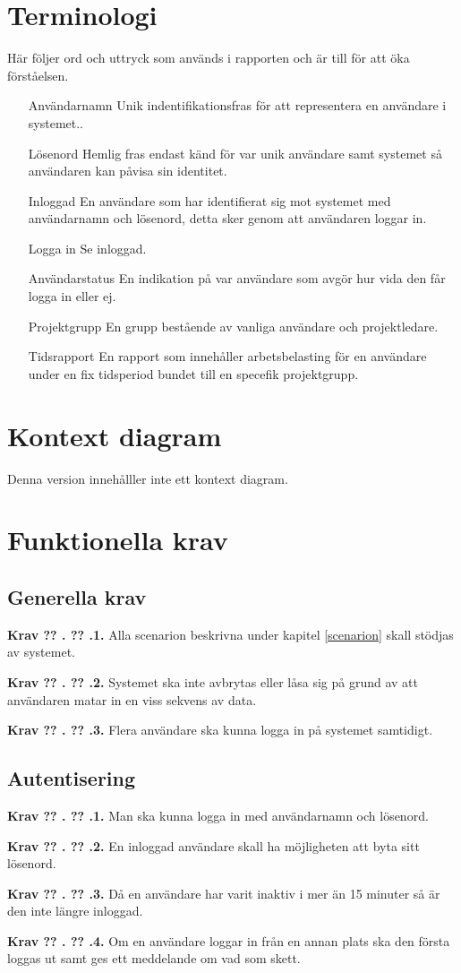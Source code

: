 \documentclass[a4paper]{article}
\newcommand\getcurrentref[1]{%
 \ifnumequal{\value{#1}}{0}
  {??}
  {\the\value{#1}}%
}
\newcommand\requirement[2]{
	\numberedrow{Krav}{#1}{#2}
}
\newcommand\numberedrow[3]{
	\noindent
	\textbf{#1 \getcurrentref{section}.\getcurrentref{subsection}.#2.} #3
	
}
\begin{document}
\section{Terminologi}
Här följer ord och uttryck som används i rapporten och är till för att öka förståelsen.
\begin{itemize}
\item [Användarnamn] Unik indentifikationsfras för att representera en användare i systemet..
\item [Lösenord] Hemlig fras endast känd för var unik användare samt systemet så användaren kan påvisa sin identitet.
\item [Inloggad] En användare som har identifierat sig mot systemet med användarnamn och lösenord, detta sker genom att användaren loggar in.
\item [Logga in] Se inloggad.
\item [Användarstatus] En indikation på var användare som avgör hur vida den får logga in eller ej.
\item [Projektgrupp] En grupp bestående av vanliga användare och projektledare.
\item [Tidsrapport] En rapport som innehåller arbetsbelasting för en användare under en fix tidsperiod bundet till en specefik projektgrupp.
\end{itemize}
\section{Kontext diagram}
Denna version innehålller inte ett kontext diagram.
\section{Funktionella krav}
\subsection{Generella krav}
 \requirement{1}{Alla scenarion beskrivna under kapitel \ref{scenarion} skall stödjas av systemet.}
 \requirement{2}{Systemet ska inte avbrytas eller låsa sig på grund av att användaren matar in en viss sekvens av data.}
 \requirement{3}{Flera användare ska kunna logga in på systemet samtidigt.}
 
\subsection{Autentisering}
\requirement{1}{Man ska kunna logga in med användarnamn och lösenord.}
\requirement{2}{En inloggad användare skall ha möjligheten att byta sitt lösenord.}
\requirement{3}{Då en användare har varit inaktiv i mer än 15 minuter så är den inte längre inloggad.}
\requirement{4}{Om en användare loggar in från en annan plats ska den första loggas ut samt ges ett meddelande om vad som skett.}
\end{document}
